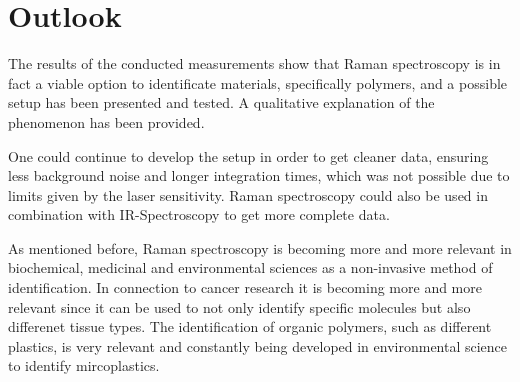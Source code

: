 \section{Outlook}
The results of the conducted measurements show that Raman spectroscopy is in fact a viable option to identificate materials, specifically polymers, and a possible setup has been presented and tested. A qualitative explanation of the phenomenon has been provided.

\bigskip

One could continue to develop the setup in order to get cleaner data, ensuring less background noise and longer integration times, which was not possible due to limits given by the laser sensitivity. Raman spectroscopy could also be used in combination with IR-Spectroscopy to get more complete data.

\bigskip

As mentioned before, Raman spectroscopy is becoming more and more relevant in biochemical, medicinal and environmental sciences as a non-invasive method of identification. In connection to cancer research it is becoming more and more relevant since it can be used to not only identify specific molecules but also differenet tissue types. The identification of organic polymers, such as different plastics, is very relevant and constantly being developed in environmental science to identify mircoplastics.
